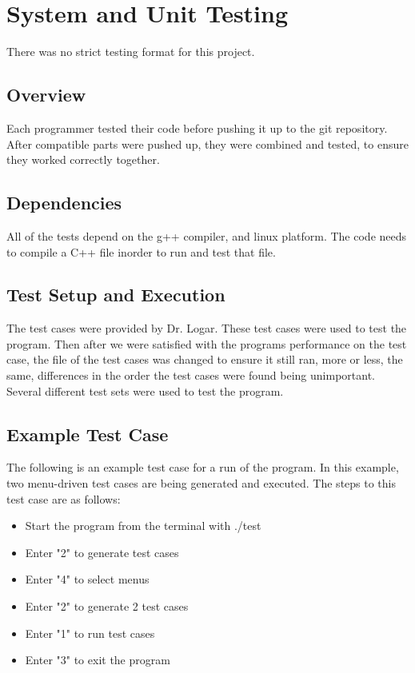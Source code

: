
\chapter{System  and Unit Testing}

There was no strict testing format for this project.

\section{Overview}
Each programmer tested their code before pushing it up to the git repository.  After compatible parts were
pushed up, they were combined and tested, to ensure they worked correctly together.

\section{Dependencies}
All of the tests depend on the g++ compiler, and linux platform.  The code needs
to compile a C++ file inorder to run and test that file.


\section{Test Setup and Execution}
The test cases were provided by Dr. Logar.  These test cases were used to test the program.
Then after we were satisfied with the programs performance on the test case, the file of the test cases
was changed to ensure it still ran, more or less, the same, differences in the order the test cases were found
being unimportant.  Several different test sets were used to test the program.

\section{Example Test Case}

The following is an example test case for a run of the program. In this example, two menu-driven test cases are being generated and executed. The steps to this test case are as follows:
\begin{itemize}
\item Start the program from the terminal with ./test
\item Enter "2" to generate test cases
\item Enter "4" to select menus
\item Enter "2" to generate 2 test cases
\item Enter "1" to run test cases
\item Enter "3" to exit the program
\end{itemize}

